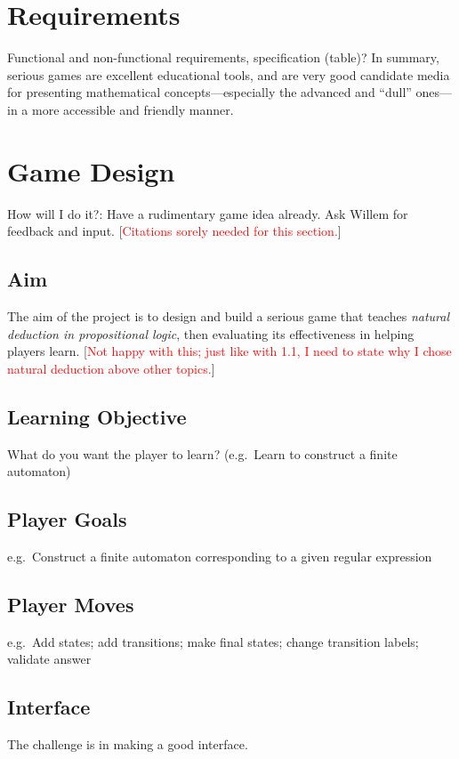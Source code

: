 \documentclass[a4paper]{article}
\newcommand{\comment}[1]{[\textcolor{red}{#1}]} %
\begin{document}
\section{Requirements} %
Functional and non-functional requirements, specification (table)?
In summary, serious games are excellent educational tools, and are very good candidate media for presenting mathematical concepts---especially the advanced and ``dull'' ones---in a more accessible and friendly manner.

\section{Game Design} %
How will I do it?: Have a rudimentary game idea already. Ask Willem for feedback and input.
\comment{Citations sorely needed for this section.}

\subsection{Aim}
The aim of the project is to design and build a serious game that teaches \emph{natural deduction in propositional logic}, then evaluating its effectiveness in helping players learn. \comment{Not happy with this; just like with 1.1, I need to state why I chose natural deduction above other topics.}

\subsection{Learning Objective}
What do you want the player to learn? (e.g.\ Learn to construct a finite automaton)

\subsection{Player Goals}
e.g.\ Construct a finite automaton corresponding to a given regular expression

\subsection{Player Moves}
e.g.\ Add states; add transitions; make final states; change transition labels; validate answer

\subsection{Interface}
The challenge is in making a good interface.
\end{document}
